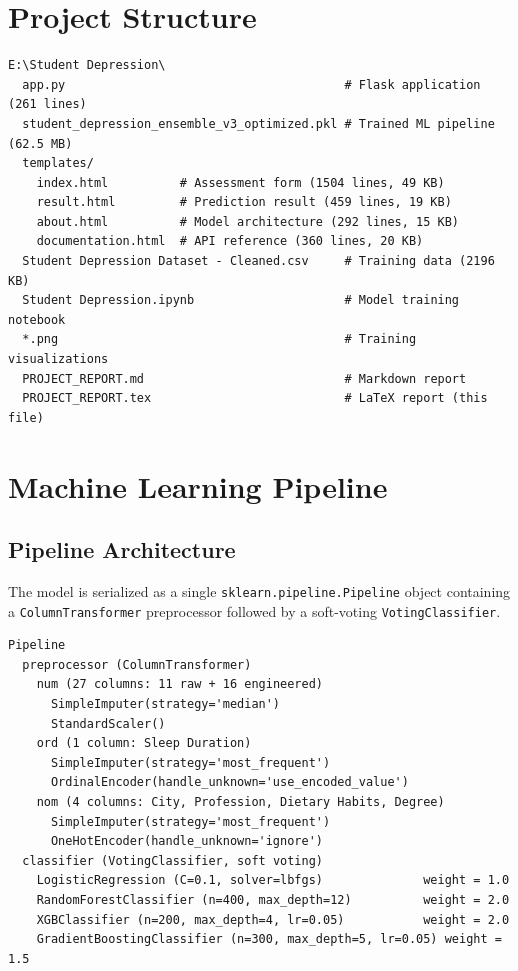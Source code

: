\documentclass[11pt,a4paper]{article}
\begin{document}
\section{Project Structure}

\begin{lstlisting}[style=bash]
E:\Student Depression\
  app.py                                       # Flask application (261 lines)
  student_depression_ensemble_v3_optimized.pkl # Trained ML pipeline (62.5 MB)
  templates/
    index.html          # Assessment form (1504 lines, 49 KB)
    result.html         # Prediction result (459 lines, 19 KB)
    about.html          # Model architecture (292 lines, 15 KB)
    documentation.html  # API reference (360 lines, 20 KB)
  Student Depression Dataset - Cleaned.csv     # Training data (2196 KB)
  Student Depression.ipynb                     # Model training notebook
  *.png                                        # Training visualizations
  PROJECT_REPORT.md                            # Markdown report
  PROJECT_REPORT.tex                           # LaTeX report (this file)
\end{lstlisting}

\section{Machine Learning Pipeline}

\subsection{Pipeline Architecture}

The model is serialized as a single \texttt{sklearn.pipeline.Pipeline} object containing a \texttt{ColumnTransformer} preprocessor followed by a soft-voting \texttt{VotingClassifier}.

\begin{lstlisting}[style=bash]
Pipeline
  preprocessor (ColumnTransformer)
    num (27 columns: 11 raw + 16 engineered)
      SimpleImputer(strategy='median')
      StandardScaler()
    ord (1 column: Sleep Duration)
      SimpleImputer(strategy='most_frequent')
      OrdinalEncoder(handle_unknown='use_encoded_value')
    nom (4 columns: City, Profession, Dietary Habits, Degree)
      SimpleImputer(strategy='most_frequent')
      OneHotEncoder(handle_unknown='ignore')
  classifier (VotingClassifier, soft voting)
    LogisticRegression (C=0.1, solver=lbfgs)              weight = 1.0
    RandomForestClassifier (n=400, max_depth=12)          weight = 2.0
    XGBClassifier (n=200, max_depth=4, lr=0.05)           weight = 2.0
    GradientBoostingClassifier (n=300, max_depth=5, lr=0.05) weight = 1.5
\end{lstlisting}
\end{document}
